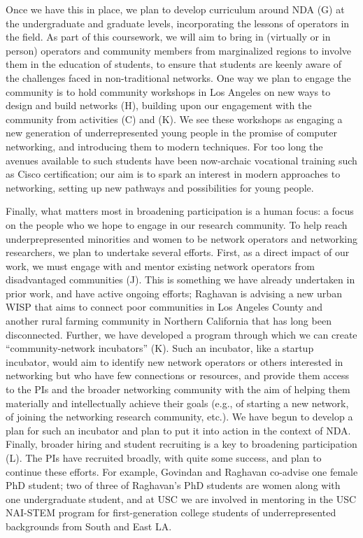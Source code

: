 \documentclass[10pt]{article}
\begin{document}
Once we have this in place, we plan to develop curriculum around NDA (G) at the undergraduate and graduate levels, incorporating the lessons of operators in the field.  As part of this coursework, we will aim to bring in (virtually or in person) operators and community members from marginalized regions to involve them in the education of students, to ensure that students are keenly aware of the challenges faced in non-traditional networks.  
One way we plan to engage the community is to hold community workshops in Los Angeles on new ways to design and build networks (H), building upon our engagement with the community from activities (C) and (K).  We see these workshops as engaging a new generation of underrepresented young people in the promise of computer networking, and introducing them to modern techniques.  For too long the avenues available to such students have been now-archaic vocational training such as Cisco certification; our aim is to spark an interest in modern approaches to networking, setting up new pathways and possibilities for young people.

Finally, what matters most in broadening participation is a human focus: a focus on the people who we hope to engage in our research community.  To help reach underprepresented minorities and women to be network operators and networking researchers, we plan to undertake several efforts.  First, as a direct impact of our work, we must engage with and mentor existing network operators from disadvantaged communities (J).  This is something we have already undertaken in prior work, and have active ongoing efforts; Raghavan is advising a new urban WISP that aims to connect poor communities in Los Angeles County and another rural farming community in Northern California that has long been disconnected.  Further, we have developed a program through which we can create ``community-network incubators'' (K).  Such an incubator, like a startup incubator, would aim to identify new network operators or others interested in networking but who have few connections or resources, and provide them access to the PIs and the broader networking community with the aim of helping them materially and intellectually achieve their goals (e.g., of starting a new network, of joining the networking research community, etc.).  We have begun to develop a plan for such an incubator and plan to put it into action in the context of NDA.
Finally, broader hiring and student recruiting is a key to broadening participation (L).  The PIs have recruited broadly, with quite some success, and plan to continue these efforts. For example, Govindan and Raghavan co-advise one female PhD student; two of three of Raghavan's PhD students are women along with one undergraduate student, and at USC we are involved in mentoring in the USC NAI-STEM program for first-generation college students of underrepresented backgrounds from South and East LA.
\end{document}

